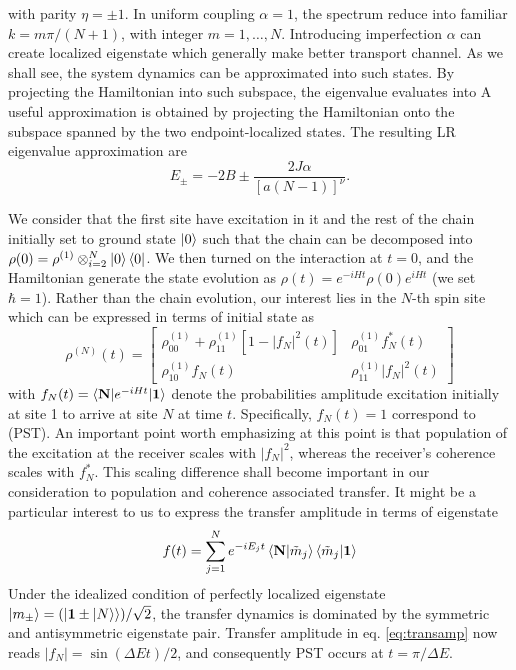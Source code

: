 \documentclass[../../../main.tex]{subfiles}
\begin{document}
with parity $\eta=\pm1$.
In uniform coupling $\alpha=1$, the spectrum  reduce into familiar $k = m\pi/(N+1)$, with integer $m=1,\ldots,N$.
Introducing imperfection $\alpha$ can create localized eigenstate which generally make better transport channel.
As we shall see, the system dynamics can be approximated into such states. 
By projecting the Hamiltonian into such subspace, the eigenvalue evaluates into
A useful approximation is obtained by projecting the Hamiltonian onto the subspace spanned by the two endpoint-localized states. 
The resulting LR eigenvalue approximation are
\begin{equation}
  E_\pm =  -2B \pm \frac{2J\alpha}{[a(N-1)]^\nu}.
\end{equation}

We consider that the first site have excitation in it and the rest of the chain initially set to ground state $\ket{0}$ such that the chain can be decomposed into $\rho(0) = \rho^{(1)}\otimes_{i=2}^{N}\ket{0}\bra{0}$.
We then turned on the interaction at $t=0$, and the Hamiltonian generate the state evolution as $\rho(t) = e^{-iHt}\rho(0)e^{iHt}$ (we set $\hbar =1$). 
Rather than the chain evolution, our interest lies in the $N$-th spin site which can be expressed in terms of initial state as 
\begin{equation}
  \rho^{(N)}(t)
  = \begin{bmatrix}
    \rho_{00}^{(1)} + \rho_{11}^{(1)} [1-|f_N|^2(t)] & \rho_{01}^{(1)}  f_N^*(t) \\
    \rho_{10}^{(1)}  f_N(t)                  & \rho_{11}^{(1)}|f_N|^2(t)
  \end{bmatrix}
\end{equation}
with $f_N(t) = \braket{\mathbf{N } | e^{-iHt}|\mathbf{1}}$ denote the probabilities amplitude excitation initially at site 1 to arrive at site $N$ at time $t$.
Specifically, $f_N(t) = 1$ correspond to (PST).
An important point worth emphasizing at this point is that population of the excitation at the receiver scales with $|f_N|^2$, whereas the receiver's coherence scales with $f_N^*$.
This scaling difference shall become important in our consideration to population and coherence associated transfer.
It might be a particular interest to us to express the transfer amplitude in terms of eigenstate 
\begin{equation}
  f(t) = \sum_{j=1}^{N} e^{-i E_j t}\braket{\mathbf{N}|\tilde{m}_j }\braket{\tilde{m}_j |\mathbf{1} }
  \label{eq:transamp}
\end{equation}
Under the idealized condition of perfectly localized eigenstate $\ket{m_\pm} = (\ket{\mathbf{1 }\pm \ket{N}})/\sqrt{2}$, the transfer dynamics is dominated by the symmetric and antisymmetric eigenstate pair.
Transfer amplitude in eq. \ref{eq:transamp} now reads $|f_N| = \sin (\Delta E t)/2$, and consequently PST occurs at $t=\pi/\Delta E$.
\end{document}
